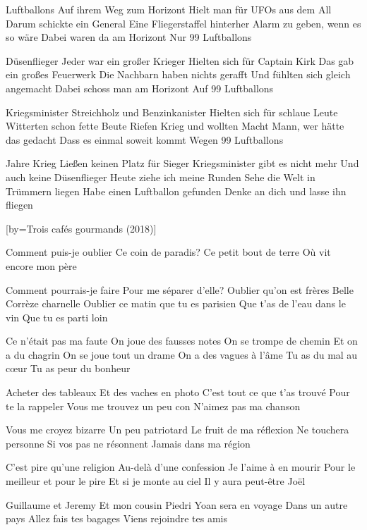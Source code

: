  Luftballons
Auf ihrem Weg zum Horizont
Hielt man für UFOs aus dem All
Darum schickte ein General
Eine Fliegerstaffel hinterher
Alarm zu geben, wenn es so wäre
Dabei waren da am Horizont
Nur 99 Luftballons
\endverse

 Düsenflieger
Jeder war ein großer Krieger
Hielten sich für Captain Kirk
Das gab ein großes Feuerwerk
Die Nachbarn haben nichts gerafft
Und fühlten sich gleich angemacht
Dabei schoss man am Horizont
Auf 99 Luftballons
\endverse

 Kriegsminister
Streichholz und Benzinkanister
Hielten sich für schlaue Leute
Witterten schon fette Beute
Riefen Krieg und wollten Macht
Mann, wer hätte das gedacht
Dass es einmal soweit kommt
Wegen 99 Luftballons
\endverse

 Jahre Krieg
Ließen keinen Platz für Sieger
Kriegsminister gibt es nicht mehr
Und auch keine Düsenflieger
Heute ziehe ich meine Runden
Sehe die Welt in Trümmern liegen
Habe einen Luftballon gefunden
Denke an dich und lasse ihn fliegen
\endverse

[by={Trois cafés gourmands (2018)}]

\beginverse
Comment puis-je oublier
Ce coin de paradis?
Ce petit bout de terre
Où vit encore mon père
\endverse

\beginverse
Comment pourrais-je faire
Pour me séparer d'elle?
Oublier qu'on est frères
Belle Corrèze charnelle
Oublier ce matin que tu es parisien
Que t'as de l'eau dans le vin
Que tu es parti loin
\endverse

\beginverse
Ce n'était pas ma faute
On joue des fausses notes
On se trompe de chemin
Et on a du chagrin
On se joue tout un drame
On a des vagues à l'âme
Tu as du mal au cœur
Tu as peur du bonheur
\endverse

\beginverse
Acheter des tableaux
Et des vaches en photo
C'est tout ce que t'as trouvé
Pour te la rappeler
Vous me trouvez un peu con
N'aimez pas ma chanson
\endverse

\beginverse
Vous me croyez bizarre
Un peu patriotard
Le fruit de ma réflexion
Ne touchera personne
Si vos pas ne résonnent
Jamais dans ma région
\endverse

\beginverse
C'est pire qu'une religion
Au-delà d'une confession
Je l'aime à en mourir
Pour le meilleur et pour le pire
Et si je monte au ciel
Il y aura peut-être Joël
\endverse

\beginverse
Guillaume et Jeremy
Et mon cousin Piedri
Yoan sera en voyage
Dans un autre pays
Allez fais tes bagages
Viens rejoindre tes amis
\endverse

